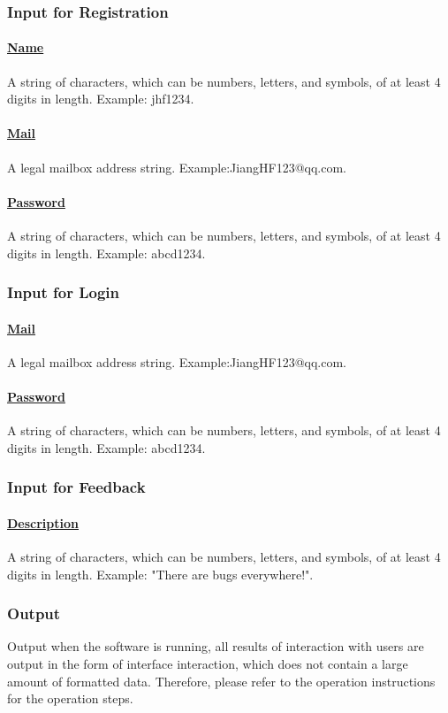 \documentclass[10pt]{article}
\begin{document}
\subsubsection{Input for Registration}
\paragraph{\underline{Name}}
A string of characters, which can be numbers, letters, and symbols, of at least 4 digits in length. Example: jhf1234.

\paragraph{\underline{Mail}}
A legal mailbox address string. Example:JiangHF123@qq.com. 

\paragraph{\underline{Password}}
A string of characters, which can be numbers, letters, and symbols, of at least 4 digits in length. Example: abcd1234.

\subsubsection{Input for Login}
\paragraph{\underline{Mail}}
A legal mailbox address string. Example:JiangHF123@qq.com. 

\paragraph{\underline{Password}}
A string of characters, which can be numbers, letters, and symbols, of at least 4 digits in length. Example: abcd1234.

\subsubsection{Input for Feedback}
\paragraph{\underline{Description}}
A string of characters, which can be numbers, letters, and symbols, of at least 4 digits in length. Example: "There are bugs everywhere!".

\subsubsection{Output}
Output when the software is running, all results of interaction with users are output in the form of interface interaction, which does not contain a large amount of formatted data. Therefore, please refer to the operation instructions for the operation steps.
\end{document}
